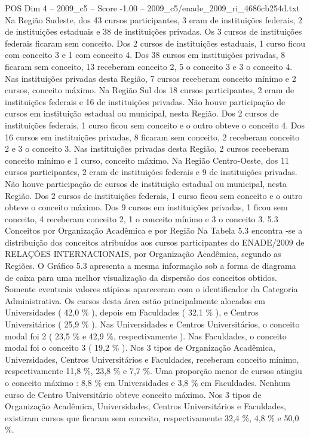 \begin{textsample}{POS Dim 4 – 2009\_c5 – Score -1.00 – 2009\_c5/enade\_2009\_ri\_4686cb254d.txt}
Na Região Sudeste, dos 43 cursos participantes, 3 eram de instituições federais, 2 de instituições estaduais e 38 de instituições privadas.
Os 3 cursos de instituições federais ficaram sem conceito.
Dos 2 cursos de instituições estaduais, 1 curso ficou com conceito 3 e 1 com conceito 4.
Dos 38 cursos em instituições privadas, 8 ficaram sem conceito, 13 receberam conceito 2, 5 o conceito 3 e 3 o conceito 4.
Nas instituições privadas desta Região, 7 cursos receberam conceito mínimo e 2 cursos, conceito máximo.
Na Região Sul dos 18 cursos participantes, 2 eram de instituições federais e 16 de instituições privadas.
Não houve participação de cursos em instituição estadual ou municipal, nesta Região.
Dos 2 cursos de instituições federais, 1 curso ficou sem conceito e o outro obteve o conceito 4.
Dos 16 cursos em instituições privadas, 8 ficaram sem conceito, 2 receberam conceito 2 e 3 o conceito 3.
Nas instituições privadas desta Região, 2 cursos receberam conceito mínimo e 1 curso, conceito máximo.
Na Região Centro-Oeste, dos 11 cursos participantes, 2 eram de instituições federais e 9 de instituições privadas.
Não houve participação de cursos de instituição estadual ou municipal, nesta Região.
Dos 2 cursos de instituições federais, 1 curso ficou sem conceito e o outro obteve o conceito máximo.
Dos 9 cursos em instituições privadas, 1 ficou sem conceito, 4 receberam conceito 2, 1 o conceito mínimo e 3 o conceito 3. 5.3 Conceitos por Organização Acadêmica e por Região Na Tabela 5.3 encontra -se a distribuição dos conceitos atribuídos aos cursos participantes do ENADE/2009 de RELAÇÕES INTERNACIONAIS, por Organização Acadêmica, segundo as Regiões.
O Gráfico 5.3 apresenta a mesma informação sob a forma de diagrama de caixa para uma melhor visualização da dispersão dos conceitos obtidos.
Somente eventuais valores atípicos apareceram com o identificador da Categoria Administrativa.
Os cursos desta área estão principalmente alocados em Universidades ( 42,0 \% ), depois em Faculdades ( 32,1 \% ), e Centros Universitários ( 25,9 \% ).
Nas Universidades e Centros Universitários, o conceito modal foi 2 ( 23,5 \% e 42,9 \%, respectivamente ).
Nas Faculdades, o conceito modal foi o conceito 3 ( 19,2 \% ).
Nos 3 tipos de Organização Acadêmica, Universidades, Centros Universitários e Faculdades, receberam conceito mínimo, respectivamente 11,8 \%, 23,8 \% e 7,7 \%.
Uma proporção menor de cursos atingiu o conceito máximo : 8,8 \% em Universidades e 3,8 \% em Faculdades.
Nenhum curso de Centro Universitário obteve conceito máximo.
Nos 3 tipos de Organização Acadêmica, Universidades, Centros Universitários e Faculdades, existiram cursos que ficaram sem conceito, respectivamente 32,4 \%, 4,8 \% e 50,0 \%.

\end{textsample}
